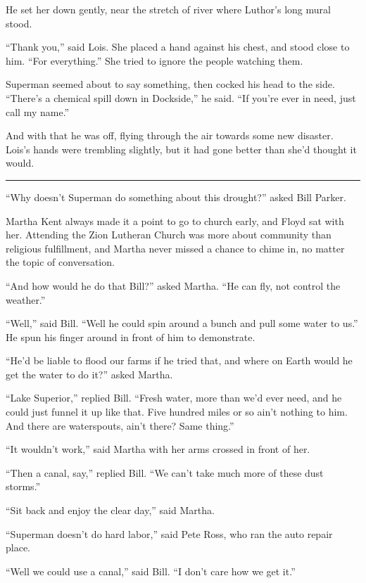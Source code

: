 He set her down gently, near the stretch of river where Luthor's long
mural stood.

``Thank you,'' said Lois. She placed a hand against his chest, and stood
close to him. ``For everything.'' She tried to ignore the people
watching them.

Superman seemed about to say something, then cocked his head to the
side. ``There's a chemical spill down in Dockside,'' he said. ``If
you're ever in need, just call my name.''

And with that he was off, flying through the air towards some new
disaster. Lois's hands were trembling slightly, but it had gone better
than she'd thought it would.

\begin{center}\rule{0.5\linewidth}{0.5pt}\end{center}

``Why doesn't Superman do something about this drought?'' asked Bill
Parker.

Martha Kent always made it a point to go to church early, and Floyd sat
with her. Attending the Zion Lutheran Church was more about community
than religious fulfillment, and Martha never missed a chance to chime
in, no matter the topic of conversation.

``And how would he do that Bill?'' asked Martha. ``He can fly, not
control the weather.''

``Well,'' said Bill. ``Well he could spin around a bunch and pull some
water to us.'' He spun his finger around in front of him to demonstrate.

``He'd be liable to flood our farms if he tried that, and where on Earth
would he get the water to do it?'' asked Martha.

``Lake Superior,'' replied Bill. ``Fresh water, more than we'd ever
need, and he could just funnel it up like that. Five hundred miles or so
ain't nothing to him. And there are waterspouts, ain't there? Same
thing.''

``It wouldn't work,'' said Martha with her arms crossed in front of her.

``Then a canal, say,'' replied Bill. ``We can't take much more of these
dust storms.''

``Sit back and enjoy the clear day,'' said Martha.

``Superman doesn't do hard labor,'' said Pete Ross, who ran the auto
repair place.

``Well we could use a canal,'' said Bill. ``I don't care how we get
it.''

